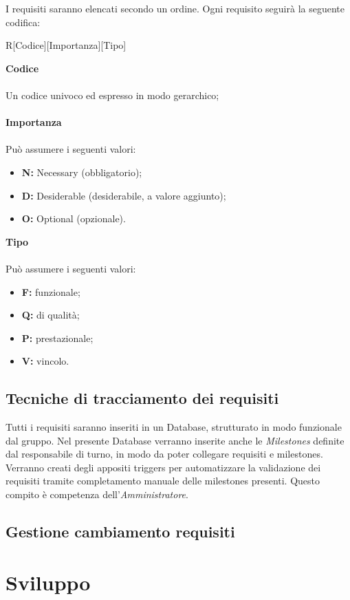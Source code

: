 \documentclass[a4paper]{report}
\begin{document}
				I requisiti saranno elencati secondo un ordine. Ogni requisito seguirà la seguente codifica: \\
				\begin{center}
					R[Codice][Importanza][Tipo]
				\end{center}
					\textbf{Codice} \\ \\ Un codice univoco ed espresso in modo gerarchico;\\ \\
					\textbf{Importanza} \\ \\Può assumere i seguenti valori:
					\begin{itemize}
						\item \textbf{N:} Necessary (obbligatorio);
						\item \textbf{D:} Desiderable (desiderabile, a valore aggiunto);
						\item \textbf{O:} Optional (opzionale).
					\end{itemize}
					\textbf{Tipo} \\ \\Può assumere i seguenti valori:
					\begin{itemize}
						\item \textbf{F:} funzionale;
						\item \textbf{Q:} di qualità;
						\item \textbf{P:} prestazionale;
						\item \textbf{V:} vincolo.
					\end{itemize}
			\subsection{Tecniche di tracciamento dei requisiti}
				Tutti i requisiti saranno inseriti in un Database, strutturato in modo funzionale dal gruppo. Nel presente Database verranno
				inserite anche le \emph{Milestones} definite dal responsabile di turno, in modo da poter collegare requisiti e milestones. 
				Verranno creati degli appositi triggers per automatizzare la validazione dei requisiti tramite completamento manuale delle
				milestones presenti. Questo compito è competenza dell'\emph{Amministratore}.
			\subsection{Gestione cambiamento requisiti}
		\section{Sviluppo}
\end{document}
